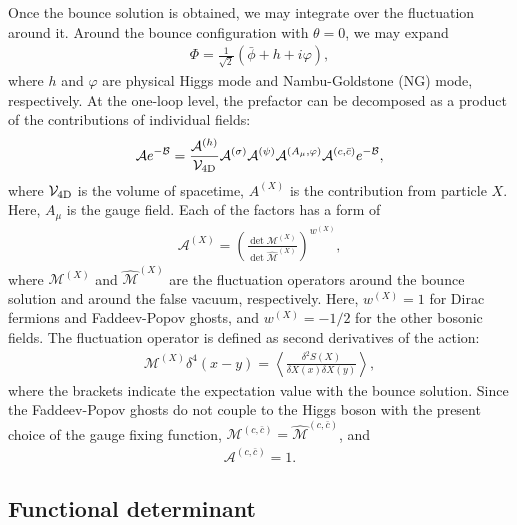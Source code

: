 \documentclass[12pt]{article}
\begin{document}
Once the bounce solution is obtained, we may integrate over the
fluctuation around it.  Around the bounce configuration with
$\theta=0$, we may expand
\begin{align}
  \Phi = \frac{1}{\sqrt{2}} \left( 
    \bar\phi + h + i \varphi
  \right),
\end{align}
where $h$ and $\varphi$ are physical Higgs mode and Nambu-Goldstone
(NG) mode, respectively.  At the one-loop level, the prefactor can be
decomposed as a product of the contributions of individual fields:
\begin{align}
  \mathcal A e^{-\mathcal B} = \frac{\mathcal A^{(h)}}{\mathcal V_{\rm 4D}}
  \mathcal A^{(\sigma)}\mathcal A^{(\psi)}\mathcal A^{(A_\mu,\varphi)}
  \mathcal A^{(c,\bar{c})}e^{-\mathcal B},
  \label{eq_AeB}
\end{align}
where $\mathcal V_{\rm 4D}$ is the volume of spacetime, $A^{(X)}$ is
the contribution from particle $X$.  Here, $A_\mu$ is the gauge
field. Each of the factors has a form of
\begin{align}
 \mathcal A^{(X)} = \left(
  \frac{\det\mathcal M^{(X)}}{\det \widehat{\mathcal M}^{(X)}}
 \right)^{w^{(X)}},
\end{align}
where $\mathcal M^{(X)}$ and $\widehat{\mathcal M}^{(X)}$ are the
fluctuation operators around the bounce solution and around the false
vacuum, respectively.  Here, $w^{(X)} = 1$ for Dirac fermions and
Faddeev-Popov ghosts, and $w^{(X)} = -1/2$ for the other bosonic
fields.  The fluctuation operator is defined as second derivatives of
the action:
\begin{align}
 \mathcal M^{(X)} \delta^4(x-y) = \left\langle
 \frac{\delta^2S(X)}{\delta X(x)\delta X(y)}
 \right\rangle,
\end{align}
where the brackets indicate the expectation value with the bounce
solution. Since the Faddeev-Popov ghosts do not couple to the Higgs
boson with the present choice of the gauge fixing function, ${\mathcal
  M}^{(c,\bar{c})}= \widehat{\mathcal M}^{(c,\bar{c})}$, and
\begin{align}
  \mathcal A^{(c,\bar{c})}=1.
\end{align}

\subsection{Functional determinant}

\end{document}
